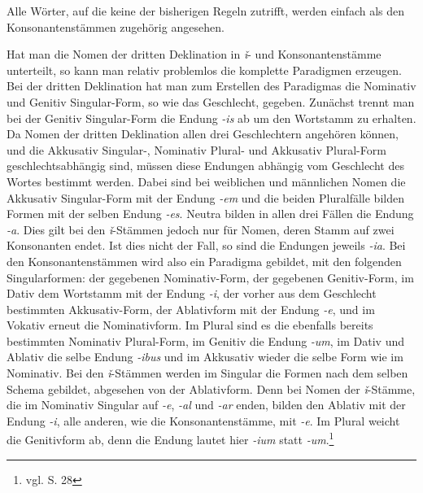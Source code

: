 \documentclass[fontsize=12pt,abstract=on,titlepage,bibliography=totoc,ngerman,listof=totoc]{scrreprt}
\begin{document}
Alle Wörter, auf die keine der bisherigen Regeln zutrifft, werden einfach als den Konsonantenstämmen zugehörig angesehen. \par
Hat man die Nomen der dritten Deklination in \textit{ǐ}- und Konsonantenstämme unterteilt, so kann man relativ problemlos die komplette Paradigmen erzeugen. Bei der dritten Deklination hat man zum Erstellen des Paradigmas die Nominativ und Genitiv Singular-Form, so wie das Geschlecht, gegeben. Zunächst trennt man bei der Genitiv Singular-Form die Endung \textit{-is} ab um den Wortstamm zu erhalten. Da Nomen der dritten Deklination allen drei Geschlechtern angehören können, und die Akkusativ Singular-, Nominativ Plural- und Akkusativ Plural-Form geschlechtsabhängig sind, müssen diese Endungen abhängig vom Geschlecht des Wortes bestimmt werden. Dabei sind bei weiblichen und männlichen Nomen die Akkusativ Singular-Form mit der Endung \textit{-em} und die beiden Pluralfälle bilden Formen mit der selben Endung \textit{-es}. Neutra bilden in allen drei Fällen die Endung \textit{-a}. Dies gilt bei den \textit{ǐ}-Stämmen jedoch nur für Nomen, deren Stamm auf zwei Konsonanten endet. Ist dies nicht der Fall, so sind die Endungen jeweils \textit{-ia}. Bei den Konsonantenstämmen wird also ein Paradigma gebildet, mit den folgenden Singularformen: der gegebenen Nominativ-Form, der gegebenen Genitiv-Form, im Dativ dem Wortstamm mit der Endung \textit{-i}, der vorher aus dem Geschlecht bestimmten Akkusativ-Form, der Ablativform mit der Endung \textit{-e}, und im Vokativ erneut die Nominativform. Im Plural sind es die ebenfalls bereits bestimmten Nominativ Plural-Form, im Genitiv die Endung \textit{-um}, im Dativ und Ablativ die selbe Endung \textit{-ibus} und im Akkusativ wieder die selbe Form wie im Nominativ. Bei den \textit{ǐ}-Stämmen werden im Singular die Formen nach dem selben Schema gebildet, abgesehen von der Ablativform. Denn bei Nomen der \textit{ǐ}-Stämme, die im Nominativ Singular auf \textit{-e}, \textit{-al} und \textit{-ar} enden, bilden den Ablativ mit der Endung \textit{-i}, alle anderen, wie die Konsonantenstämme, mit \textit{-e}. Im Plural weicht die Genitivform ab, denn die Endung lautet hier \textit{-ium} statt \textit{-um}.\footnote{vgl. \cite{BAYER-LINDAUER1994} S. 28} \par
\end{document}
